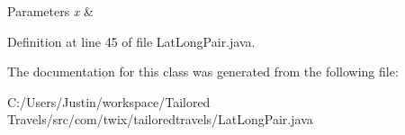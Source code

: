\begin{DoxyParams}{Parameters}
{\em x} & \\
\hline
\end{DoxyParams}


Definition at line 45 of file Lat\-Long\-Pair.\-java.



The documentation for this class was generated from the following file\-:\begin{DoxyCompactItemize}
\item 
C\-:/\-Users/\-Justin/workspace/\-Tailored Travels/src/com/twix/tailoredtravels/Lat\-Long\-Pair.\-java\end{DoxyCompactItemize}
